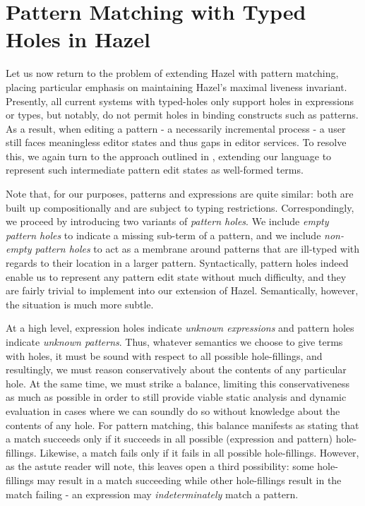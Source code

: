 \section{Pattern Matching with Typed Holes in Hazel}\label{sec:pattern-matching}

Let us now return to the problem of extending Hazel with pattern matching, placing particular emphasis on maintaining Hazel's maximal liveness invariant. Presently, all current systems with typed-holes only support holes in expressions or types, but notably, do not permit holes in binding constructs such as patterns. As a result, when editing a pattern - a necessarily incremental process - a user still faces meaningless editor states and thus gaps in editor services. To resolve this, we again turn to the approach outlined in \cite{DBLP:conf/snapl/OmarVHSGAH17}, extending our language to represent such intermediate pattern edit states as well-formed terms. 

Note that, for our purposes, patterns and expressions are quite similar: both are built up compositionally and are subject to typing restrictions. Correspondingly, we proceed by introducing two variants of \emph{pattern holes}. We include \emph{empty pattern holes} to indicate a missing sub-term of a pattern, and we include \emph{non-empty pattern holes} to act as a membrane around patterns that are ill-typed with regards to their location in a larger pattern. Syntactically, pattern holes indeed enable us to represent any pattern edit state without much difficulty, and they are fairly trivial to implement into our extension of Hazel. Semantically, however, the situation is much more subtle. 

At a high level, expression holes indicate \emph{unknown expressions} and pattern holes indicate \emph{unknown patterns}. Thus, whatever semantics we choose to give terms with holes, it must be sound with respect to all possible hole-fillings, and resultingly, we must reason conservatively about the contents of any particular hole. At the same time, we must strike a balance, limiting this conservativeness as much as possible in order to still provide viable static analysis and dynamic evaluation in cases where we can soundly do so without knowledge about the contents of any hole. For pattern matching, this balance manifests as stating that a match succeeds only if it succeeds in all possible (expression and pattern) hole-fillings. Likewise, a match fails only if it fails in all possible hole-fillings. However, as the astute reader will note, this leaves open a third possibility: some hole-fillings may result in a match succeeding while other hole-fillings result in the match failing - an expression may \emph{indeterminately} match a pattern. 

